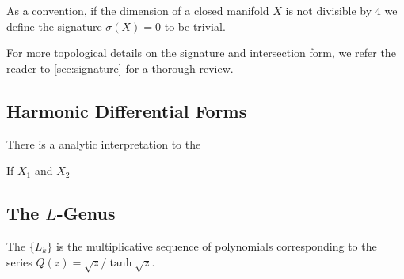\begin{remark}
	As a convention, if the dimension of a closed manifold $X$ is not divisible by $4$ we define the signature $\sigma(X)=0$ to be trivial.
\end{remark}

For more topological details on the signature and intersection form, we refer the reader to \cref{sec:signature} for a thorough review.

\subsection*{Harmonic Differential Forms}

There is a analytic interpretation to the 

If $X_1$ and $X_2$


\subsection*{The $L$-Genus}

\begin{definition}
	The  $\{L_k\}$ is the multiplicative sequence of polynomials corresponding to the series $Q(z) = \sqrt{z}/\tanh\sqrt{z}$.
\end{definition}

